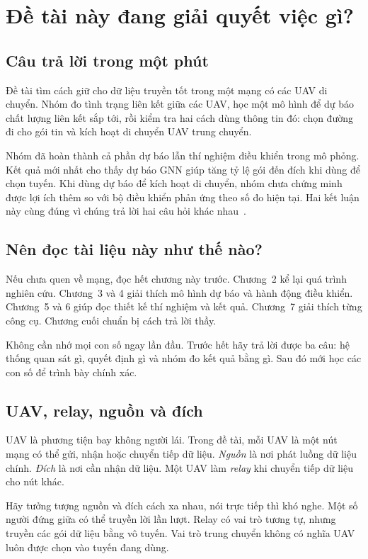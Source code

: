 \chapter{Đề tài này đang giải quyết việc gì?}
\section{Câu trả lời trong một phút}
Đề tài tìm cách giữ cho dữ liệu truyền tốt trong một mạng có các UAV di chuyển. Nhóm đo tình trạng liên kết giữa các UAV, học một mô hình để dự báo chất lượng liên kết sắp tới, rồi kiểm tra hai cách dùng thông tin đó: chọn đường đi cho gói tin và kích hoạt di chuyển UAV trung chuyển.

Nhóm đã hoàn thành cả phần dự báo lẫn thí nghiệm điều khiển trong mô phỏng. Kết quả mới nhất cho thấy dự báo GNN giúp tăng tỷ lệ gói đến đích khi dùng để chọn tuyến. Khi dùng dự báo để kích hoạt di chuyển, nhóm chưa chứng minh được lợi ích thêm so với bộ điều khiển phản ứng theo số đo hiện tại. Hai kết luận này cùng đúng vì chúng trả lời hai câu hỏi khác nhau~\cite{paper}.


\section{Nên đọc tài liệu này như thế nào?}
Nếu chưa quen về mạng, đọc hết chương này trước. Chương~2 kể lại quá trình nghiên cứu. Chương~3 và 4 giải thích mô hình dự báo và hành động điều khiển. Chương~5 và 6 giúp đọc thiết kế thí nghiệm và kết quả. Chương~7 giải thích từng công cụ. Chương cuối chuẩn bị cách trả lời thầy.

Không cần nhớ mọi con số ngay lần đầu. Trước hết hãy trả lời được ba câu: hệ thống quan sát gì, quyết định gì và nhóm đo kết quả bằng gì. Sau đó mới học các con số để trình bày chính xác.

\section{UAV, relay, nguồn và đích}
UAV là phương tiện bay không người lái. Trong đề tài, mỗi UAV là một nút mạng có thể gửi, nhận hoặc chuyển tiếp dữ liệu. \emph{Nguồn} là nơi phát luồng dữ liệu chính. \emph{Đích} là nơi cần nhận dữ liệu. Một UAV làm \emph{relay} khi chuyển tiếp dữ liệu cho nút khác.

Hãy tưởng tượng nguồn và đích cách xa nhau, nói trực tiếp thì khó nghe. Một số người đứng giữa có thể truyền lời lần lượt. Relay có vai trò tương tự, nhưng truyền các gói dữ liệu bằng vô tuyến. Vai trò trung chuyển không có nghĩa UAV luôn được chọn vào tuyến đang dùng.

